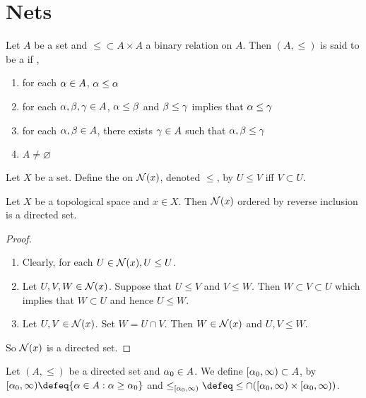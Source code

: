 \documentclass{book}
\begin{document}
\newpage
\section{Nets}	

	\begin{defn} 
	Let $A$ be a set and $\leq \subset A \times A$ a binary relation on $A$. Then $(A, \leq)$ is said to be a  if , 
	\begin{enumerate}
	\item for each $\alpha \in A$, $\alpha \leq \alpha$
	\item for each $\alpha, \beta, \gamma \in A$, $\alpha \leq \beta$ and $\beta \leq \gamma$ implies that $\alpha \leq \gamma$
	\item for each $\alpha, \beta \in A$, there exists $\gamma \in A$ such that $\alpha, \beta \leq \gamma$
	\item $A \neq \varnothing$
	\end{enumerate}
	\end{defn}
	
	\begin{defn} 
	Let $X$ be a set. Define the  on $\mathcal{N}(x)$, denoted $\leq$, by $U \leq V$ iff $V \subset U$. 
	\end{defn}
	
	\begin{ex} 
	Let $X$ be a topological space and $x \in X$. Then $\mathcal{N}(x)$ ordered by reverse inclusion is a directed set.
	\end{ex}
	
	\begin{proof}\
	\begin{enumerate}
	\item Clearly, for each $U \in \mathcal{N}(x), U \leq U$.
	\item Let $U,V,W \in \mathcal{N}(x)$. Suppose that $U \leq V$ and $V \leq W$. Then $W \subset V \subset U$ which implies that $W \subset U$ and hence $U \leq W$.
	\item Let $U,V \in \mathcal{N}(x)$. Set $W = U \cap V$. Then $W \in \mathcal{N}(x)$ and $U,V \leq W$. 
	\end{enumerate}
	So $\mathcal{N}(x)$ is a directed set. 
	\end{proof}

	\begin{defn}
		Let $(A, \leq)$ be a directed set and $\alpha_0 \in A$. We define $[\alpha_0, \infty) \subset A$, by $[\al_0, \infty) \defeq \{\al \in A: \al \geq \al_0\}$ and $\leq_{[\al_0, \infty)} \defeq \leq \cap ([\al_0, \infty) \times [\al_0, \infty))$.
	\end{defn}
\end{document}
